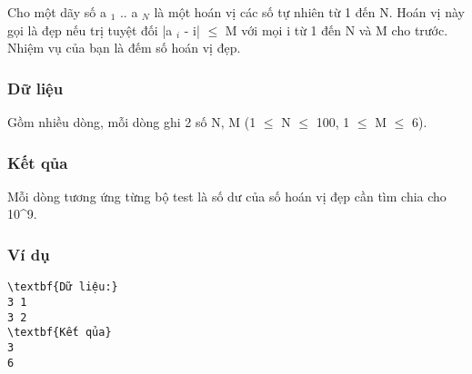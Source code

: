 



   Cho một dãy số a   $_    1   $   .. a   $_    N   $   là một hoán vị các số tự nhiên từ 1 đến N. Hoán vị này gọi là đẹp nếu trị tuyệt đối |a   $_    i   $   - i|  $\le$  M với mọi i từ 1 đến N và M cho trước. Nhiệm vụ của bạn là đếm số hoán vị đẹp.  

\subsubsection{   Dữ liệu  }

   Gồm nhiều dòng, mỗi dòng ghi 2 số N, M (1 $\le$  N  $\le$  100, 1  $\le$  M  $\le$  6).  

\subsubsection{   Kết qủa  }

   Mỗi dòng tương ứng từng bộ test là số dư  của số hoán vị đẹp cần tìm chia cho 10\textasciicircum9.  

\subsubsection{   Ví dụ  }
\begin{verbatim}
\textbf{Dữ liệu:} 
3 1
3 2
\textbf{Kết qủa} 
3
6
\end{verbatim}

